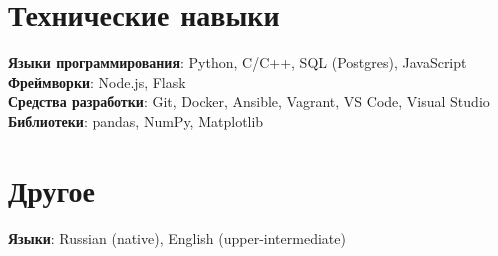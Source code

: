 \section{Технические навыки}
\begin{itemize}[leftmargin=0.15in, label={}]
  \small{\item{
        \textbf{Языки программирования}{: Python, C/C++, SQL (Postgres), JavaScript} \\
        \textbf{Фреймворки}{: Node.js, Flask} \\
        \textbf{Средства разработки}{: Git, Docker, Ansible, Vagrant, VS Code, Visual Studio} \\
        \textbf{Библиотеки}{: pandas, NumPy, Matplotlib}
        }}
\end{itemize}

\section{Другое}
\begin{itemize}[leftmargin=0.15in, label={}]
  \small{\item{
        \textbf{Языки}{: Russian (native), English (upper-intermediate)} \\
        }}
\end{itemize}
